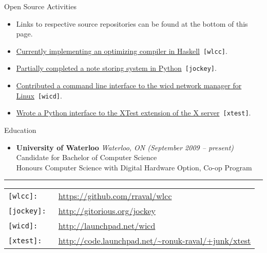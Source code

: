 \documentclass[11pt,oneside]{article}
\newcommand{\respara}[1]{
    \vspace{4pt}
    {\fontfamily{phv} \selectfont \Large #1} \\
    \vspace{4pt}
    \hspace{19pt}
}
\newenvironment{ressection}[1]{
    \respara{#1}
    \begin{itemize}
    \vspace{-20pt}
}{
    \end{itemize}
}
\newcommand{\resitem}[1]{
    \vspace{-4pt}
    \item \begin{flushleft} #1 \end{flushleft}
}
\newcommand{\resbigitem}[3]{
    \item
    \textbf{#1} \hfill \textit{#2} \\
    #3
}
\begin{document}
\begin{ressection}{Open Source Activities}
    \item[] \hspace{-2.6em} Links to respective source repositories can be found at the bottom of this page.

    \resitem{\href{https://github.com/rraval/wlcc}{Currently implementing an optimizing compiler in
        Haskell}~\texttt{[wlcc]}.}

    \resitem{\href{http://gitorious.org/jockey}{Partially completed a note storing system in
        Python}~\texttt{[jockey]}.}

    \resitem{\href{http://launchpad.net/wicd}{Contributed a command line interface to the wicd
        network manager for Linux}~\texttt{[wicd]}.}

    \resitem{\href{http://code.launchpad.net/~ronuk-raval/+junk/xtest}{Wrote a Python interface
        to the XTest extension of the X server}~\texttt{[xtest]}.}

\end{ressection}

\begin{ressection}{Education}

    \resbigitem{University of Waterloo}{Waterloo, ON (September 2009 -- present)}
        {Candidate for Bachelor of Computer Science\\Honours Computer Science
            with Digital Hardware Option, Co-op Program}

\end{ressection}

\rule{\textwidth}{1pt}
\begin{tabular}{l l}
  \texttt{[wlcc]: } & \url{https://github.com/rraval/wlcc} \\
  \texttt{[jockey]: } & \url{http://gitorious.org/jockey} \\
  \texttt{[wicd]: } & \url{http://launchpad.net/wicd} \\
  \texttt{[xtest]: } & \url{http://code.launchpad.net/~ronuk-raval/+junk/xtest} \\
\end{tabular}
\end{document}
